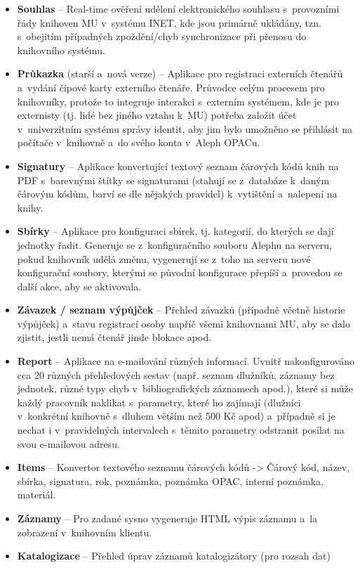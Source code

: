 \documentclass[
	11pt, oneside, printed, final, palatino
	microtype,
	table,   %
	lof,     %
	lot     %
]{fithesis3}
\newcommand{\bold}[1]{\textbf{#1}}
\begin{document}
{\begin{itemize}
\item \bold{Souhlas} – Real-time ověření udělení elektronického souhlasu s~provozními řády knihoven MU v~systému INET, kde jsou primárně ukládány, tzn. s~obejitím případných zpoždění/chyb synchronizace při přenosu do knihovního systému.
\item \bold{Průkazka} (starší a~nová verze) – Aplikace pro registraci externích čtenářů a~vydání čipové karty externího čtenáře. Průvodce celým procesem pro knihovníky, protože to integruje interakci s~externím systémem, kde je pro externisty (tj. lidé bez jiného vztahu k~MU) potřeba založit účet v~univerzitním systému správy identit, aby jim bylo umožněno se přihlásit na počítače v~knihovně a~do svého konta v~Aleph OPACu.
\item \bold{Signatury} – Aplikace konvertující textový seznam čárových kódů knih na PDF s~barevnými štítky se signaturami (stahují se z~databáze k~daným čárovým kódům, barví se dle nějakých pravidel) k~vytištění a~nalepení na knihy.
\item \bold{Sbírky} – Aplikace pro konfiguraci sbírek, tj. kategorií, do kterých se dají jednotky řadit. Generuje se z~konfiguračního souboru Alephu na serveru, pokud knihovník udělá změnu, vygenerují se z~toho na serveru nové konfigurační soubory, kterými se původní konfigurace přepíší a~provedou se další akce, aby se aktivovala.
\item \bold{Závazek / seznam výpůjček} – Přehled závazků (případně včetně historie výpůjček) a~stavu registrací osoby napříč všemi knihovnami MU, aby se dalo zjistit, jestli nemá čtenář jinde blokace apod.
\item \bold{Report} – Aplikace na e-mailování různých informací. Uvnitř nakonfigurováno cca 20 různých přehledových sestav (např. seznam dlužníků, záznamy bez jednotek, různé typy chyb v~bibliografických záznamech apod.), které si může každý pracovník naklikat s~parametry, které ho zajímají (dlužníci v~konkrétní knihovně s~dluhem větším než 500 Kč apod) a~případně si je nechat i v~pravidelných intervalech s~těmito parametry odstranit posílat na svou e-mailovou adresu.
\item \bold{Items} – Konvertor textového seznamu čárových kódů -> Čárový kód, název, sbírka, signatura, rok, poznámka, poznámka OPAC, interní poznámka, materiál.
\item \bold{Záznamy} – Pro zadané sysno vygeneruje HTML výpis záznamu a~la zobrazení v~knihovním klientu.
\item \bold{Katalogizace} – Přehled úprav záznamů katalogizátory (pro rozsah dat)

\end{itemize}}
\end{document}
